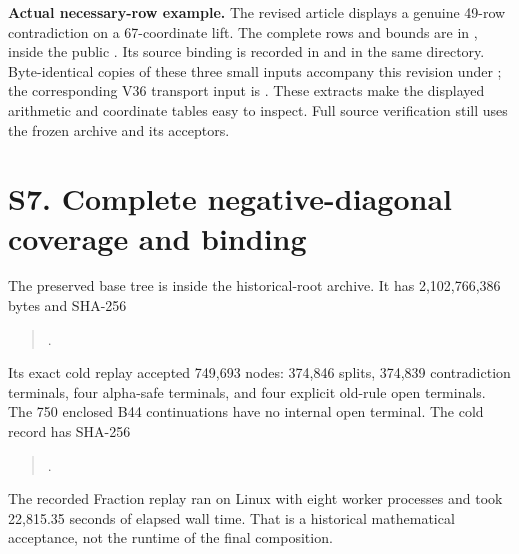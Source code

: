 \documentclass[10pt]{article}
\begin{document}
\textbf{Actual necessary-row example.}
The revised article displays a genuine 49-row contradiction on a
67-coordinate lift. The complete rows and bounds are in
, inside the public
. Its source binding is recorded in
 and
 in the same directory.
Byte-identical copies of these three small inputs accompany this
revision under ; the corresponding
V36 transport input is .
These extracts make the displayed arithmetic and coordinate tables
easy to inspect. Full source verification still uses the frozen
archive and its acceptors.

\section*{S7. Complete negative-diagonal coverage and binding}

The preserved base tree is
inside the historical-root archive. It has 2,102,766,386 bytes and SHA-256
\begin{quote}
.
\end{quote}
Its exact cold replay accepted 749,693 nodes: 374,846 splits,
374,839 contradiction terminals, four alpha-safe terminals, and four
explicit old-rule open terminals. The 750 enclosed B44 continuations
have no internal open terminal. The cold record
has SHA-256
\begin{quote}
.
\end{quote}
The recorded Fraction replay ran on Linux with eight worker processes
and took 22,815.35 seconds of elapsed wall time. That is a historical mathematical acceptance, not the runtime
of the final composition.
\end{document}
